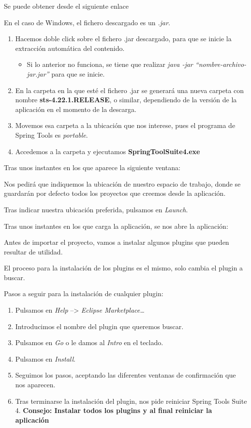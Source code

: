 Se puede obtener desde el siguiente enlace \cite{web:springtoolssuite}

En el caso de Windows, el fichero descargado es un \textit{.jar}. 

\begin{enumerate}
	\item Hacemos doble click sobre el fichero .jar descargado, para que se inicie la extracción automática del contenido.
	\begin{itemize}
		\item Si lo anterior no funciona, se tiene que realizar \textit{java -jar ``nombre-archivo-jar.jar''} para que se inicie.
	\end{itemize}
	\item En la carpeta en la que esté el fichero .jar se generará una nueva carpeta con nombre \textbf{sts-4.22.1.RELEASE}, o similar, dependiendo de la versión de la aplicación en el momento de la descarga.
	\item Movemos esa carpeta a la ubicación que nos interese, pues el programa de Spring Tools es \textit{portable}.
	\item Accedemos a la carpeta y ejecutamos \textbf{SpringToolSuite4.exe}
\end{enumerate}

Tras unos instantes en los que aparece la siguiente ventana:

Nos pedirá que indiquemos la ubicación de nuestro espacio de trabajo, donde se guardarán por defecto todos los proyectos que creemos desde la aplicación.

Tras indicar nuestra ubicación preferida, pulsamos en \textit{Launch}.

Tras unos instantes en los que carga la aplicación, se nos abre la aplicación:


Antes de importar el proyecto, vamos a instalar algunos plugins que pueden resultar de utilidad.

El proceso para la instalación de los plugins es el mismo, solo cambia el plugin a buscar.

Pasos a seguir para la instalación de cualquier plugin:
\begin{enumerate}
	\item Pulsamos en \textit{Help} --> \textit{Eclipse Marketplace\dots}
	\item Introducimos el nombre del plugin que queremos buscar.
	\item Pulsamos en \textit{Go} o le damos al \textit{Intro} en el teclado.
	\item Pulsamos en \textit{Install}.
	\item Seguimos los pasos, aceptando las diferentes ventanas de confirmación que nos aparecen.
	\item Tras terminarse la instalación del plugin, nos pide reiniciar Spring Tools Suite 4. \textbf{Consejo: Instalar todos los plugins y al final reiniciar la aplicación}
\end{enumerate}

